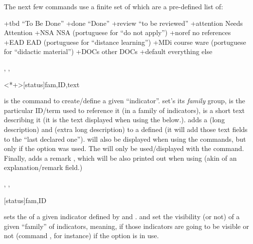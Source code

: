 \documentclass[dctools,english]{ufrgscca} %
\begin{document}
The next few commands use a finite set of  which are a pre-defined list of:
\begin{Values+}
    \DescribeValue+{tbd} “To Be Done”%
    \DescribeValue+{done} “Done”%
    \DescribeValue+{review} “to be reviewed”%
    \DescribeValue+{attention} Needs Attention%
    \DescribeValue+{NSA} NSA (portuguese for “do not apply”)%
    \DescribeValue+{noref} no references%
    \DescribeValue+{EAD} EAD (portuguese for “distance learning”)%
    \DescribeValue+{MDi} course ware (portuguese for “didactic material”) %
    \DescribeValue+{DOCs} other DOCs%
    \DescribeValue+{default} everything else%
\end{Values+}

\begin{Macros}{\declareindicator, \indicatorDesc, \indicatorText}
	\begin{Syntax}%
		\Macro{\declareindicator}<*+>[status]{fam,ID,text}
	\end{Syntax}
\Macro{\declareindicator}{} is the command to create/define a given “indicator”.  set's its \emph{family} group,  is the particular ID/term used to reference it (in a family of indicators),  is a short text describing it (it is the text displayed when using the \Macro{\indref}{} below.). \Macro{\indicatorDesc}{} adds a  (long description) and  (extra long description) to a defined \Macro{\declareindicator}{} (it will add those text fields to the “last declared one”).  will also be displayed when using the \Macro{\indref}{} commands, but only if the  option was used. The  will only be used/displayed with the \Macro{\PrintIndicators}{} command. Finally,  adds a remark , which will be also printed out when using  \Macro{\lstind}{} (akin of an explanation/remark field.)
\end{Macros}

\begin{Macros}{\indsetstatus, \indsetview, \indsethide}
	\begin{Syntax}%
	\Macro{\indsetstatus}[status]{fam,ID}
	\Macro{\indsetview}{fam}
	\Macro{\indsethide}{fam}
\end{Syntax}
 sets the  of a given indicator defined by  and . \Macro{\indsetview}{} and  set the visibility (or not) of a given “family” of indicators, meaning, if those indicators are going to be visible or not (command \Macro{\indref}{}, for instance) if the option  is in use.
\end{Macros}
\end{document}
